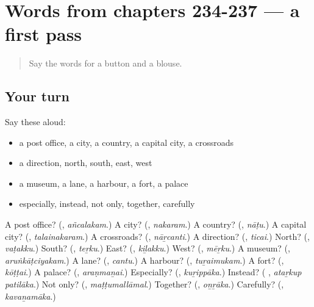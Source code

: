 \section[(dialogue)]{Words from chapters 234-237 — a first pass}

\label{lesson:TA-R242-first-pass-words-from-chapters-234-237}



\begin{quote}
Say the words for a button and a blouse.
\end{quote}

\subsection*{Your turn}
Say these aloud:

\begin{itemize}
\raggedright
  \item a post office, a city, a country, a capital city, a crossroads
  \item a direction, north, south, east, west
  \item a museum, a lane, a harbour, a fort, a palace
  \item especially, instead, not only, together, carefully
\end{itemize}

\begin{tcolorbox}[breakable,colback=teal!4,colframe=teal!35!black,title={Before you move on}]
A post office? (\textbf{}, \emph{añcalakam}.) A city? (\textbf{}, \emph{nakaram}.) A country? (\textbf{}, \emph{nāṭu}.) A capital city? (\textbf{}, \emph{talainakaram}.) A crossroads? (\textbf{}, \emph{nāṟcanti}.) A direction? (\textbf{}, \emph{ticai}.) North? (\textbf{}, \emph{vaṭakku}.) South? (\textbf{}, \emph{teṟku}.) East? (\textbf{}, \emph{kiḻakku}.) West? (\textbf{}, \emph{mēṟku}.) A museum? (\textbf{}, \emph{aruṅkāṭciyakam}.) A lane? (\textbf{}, \emph{cantu}.) A harbour? (\textbf{}, \emph{tuṟaimukam}.) A fort? (\textbf{}, \emph{kōṭṭai}.) A palace? (\textbf{}, \emph{araṇmaṉai}.) Especially? (\textbf{}, \emph{kuṟippāka}.) Instead? (\textbf{ }, \emph{ataṟkup patilāka}.) Not only? (\textbf{}, \emph{maṭṭumallāmal}.) Together? (\textbf{}, \emph{oṉṟāka}.) Carefully? (\textbf{}, \emph{kavaṉamāka}.)
\end{tcolorbox}
